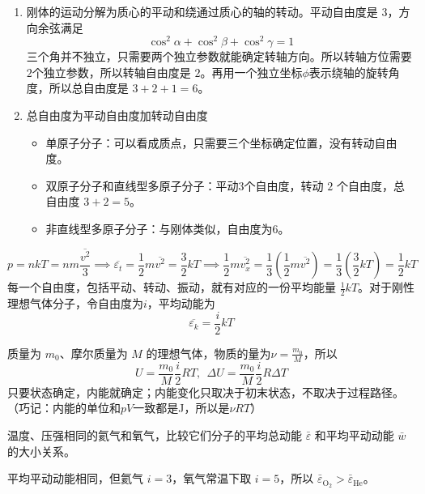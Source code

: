 \documentclass[lang=cn,11pt]{elegantbook}
\begin{document}
\begin{definition}
\begin{enumerate}
    \item 刚体的运动分解为质心的平动和绕通过质心的轴的转动。平动自由度是 \(3\)，方向余弦满足\[\cos^2\alpha+\cos^2\beta+\cos^2\gamma=1\]三个角并不独立，只需要两个独立参数就能确定转轴方向。所以转轴方位需要\(2\)个独立参数，所以转轴自由度是 \(2\)。再用一个独立坐标$\phi$表示绕轴的旋转角度，所以总自由度是 \(3+2+1=6\)。
    \item 总自由度为平动自由度加转动自由度
    \begin{itemize}
    \item 单原子分子：可以看成质点，只需要三个坐标确定位置，没有转动自由度。
    \item 双原子分子和直线型多原子分子：平动3个自由度，转动 \(2\) 个自由度，总自由度 \(3+2=5\)。
    \item 非直线型多原子分子：与刚体类似，自由度为6。
    \end{itemize}
\end{enumerate}
\end{definition}

\begin{theorem}[能量按自由度均分原理]
\[p=nkT=nm\frac{\overline{v^2}}{3}\implies \overline{\varepsilon_t}=\frac12m\overline{v^2}=\frac32kT\implies\frac12m\overline{v_x^2}=\frac13\left(\frac12m\overline{v^2}\right)=\frac13\left(\frac32kT\right)=\frac12kT\]每一个自由度，包括平动、转动、振动，就有对应的一份平均能量 \(\frac12kT\)。对于刚性理想气体分子，令自由度为$i$，平均动能为\[\overline{\varepsilon_k}=\frac{i}{2}kT\]
\end{theorem}

\begin{definition}[理想气体的热力学能，内能]
    质量为 \(m_0\)、摩尔质量为 \(M\) 的理想气体，物质的量为\(\nu=\frac{m_0}{M}\)，所以\[U=\frac{m_0}{M}\frac{i}{2}RT,~~\Delta U=\frac{m_0}{M}\frac{i}{2}R\Delta T\]只要状态确定，内能就确定；内能变化只取决于初末状态，不取决于过程路径。（巧记：内能的单位和$pV$一致都是J，所以是\(\nu RT\)）
\end{definition}

\begin{exercise}
温度、压强相同的氦气和氧气，比较它们分子的平均总动能 \(\bar{\varepsilon}\) 和平均平动动能 \(\bar{w}\) 的大小关系。
\end{exercise}

\begin{solution}
平均平动动能相同，但氦气 \(i=3\)，氧气常温下取 \(i=5\)，所以 \(\bar\varepsilon_{\mathrm{O_2}}>\bar\varepsilon_{\mathrm{He}}\)。
\end{solution}
\end{document}
